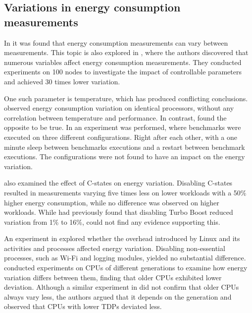 \subsection{Variations in energy consumption measurements}

In \cite{biksbois} it was found that energy consumption measurements can vary between measurements. This topic is also explored in \cite{Ournani2020}, where the authors discovered that numerous variables affect energy consumption measurements. They conducted experiments on 100 nodes to investigate the impact of controllable parameters and achieved 30 times lower variation.

One such parameter is temperature, which has produced conflicting conclusions. \cite{Kistowski2016} observed energy consumption variation on identical processors, without any correlation between temperature and performance. In contrast, \cite{Wang2018} found the opposite to be true. In \cite{Ournani2020} an experiment was performed, where benchmarks were executed on three different configurations. Right after each other, with a one minute sleep between benchmarks executions and a restart between benchmark executions. The configurations were not found to have an impact on the energy variation. 

\cite{Ournani2020} also examined the effect of C-states on energy variation. Disabling C-states resulted in measurements varying five times less on lower workloads with a 50\% higher energy consumption, while no difference was observed on higher workloads. While \cite{Acun2016} had previously found that disabling Turbo Boost reduced variation from 1\% to 16\%, \cite{Ournani2020} could not find any evidence supporting this.


An experiment in \cite{Ournani2020} explored whether the overhead introduced by Linux and its activities and processes affected energy variation. Disabling non-essential processes, such as Wi-Fi and logging modules, yielded no substantial difference. \cite{Marathe2017, Wang2019} conducted experiments on CPUs of different generations to examine how energy variation differs between them, finding that older CPUs exhibited lower deviation. Although a similar experiment in \cite{Ournani2020} did not confirm that older CPUs always vary less, the authors argued that it depends on the generation and observed that CPUs with lower TDPs deviated less.


